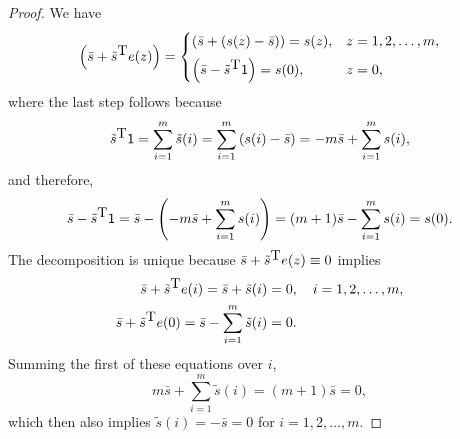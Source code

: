 \documentclass[10pt,a4paper]{amsart}
\def\ones{{\sf 1}}
\def\tp{{\hbox{\rm\tiny T}}}
\begin{document}
\begin{proof}
  We have 
  \begin{equation*}
\left( \bar{s} +\tilde{s}^\tp e(z) \right)   = \begin{cases}
\left( \bar{s} + ( s(z) -\bar{s} )\right) = s(z) , &  z=1,2,\hdots,m,\\[5pt]
   \left( \bar{s} - \tilde{s}^\tp \ones \right) = s(0),
     & z=0,
     \end{cases}
 \end{equation*}
 where the last step follows because
 \begin{equation*}
   \tilde{s}^\tp \ones = \sum_{i=1}^m \tilde{s}(i)  = \sum_{i=1}^m
     \left(s(i) - \bar{s} \right) = - m \bar{s}  + \sum_{i=1}^m s(i),\end{equation*}
and therefore,  \begin{equation*}
\bar{s} - \tilde{s}^\tp \ones = \bar{s} - \left(- m \bar{s} +
  \sum_{i=1}^m s(i) \right) = (m+1) \bar{s} - \sum_{i=1}^m s(i) = s(0).
\end{equation*}
The decomposition is unique because $\bar{s} + \tilde{s}^\tp e(z)
\equiv 0$ implies
\begin{align*}
  \bar{s} + \tilde{s}^\tp e(i) = \bar{s} + \tilde{s}(i) &= 0, \quad i=1,2,\hdots,m, \\
  \bar{s} + \tilde{s}^\tp e(0) = \bar{s} - \sum_{i=1}^m \tilde{s}(i) &= 0.
\end{align*}
Summing the first of these equations over $i$,
\begin{equation*}
m\bar{s} + \sum_{i=1}^m \tilde{s}(i) = (m+1) \bar{s} =0,
\end{equation*}
which then also implies $\tilde{s}(i) = -\bar{s} =0$ for
$i=1,2,\hdots,m$.         
\end{proof}
\end{document}
